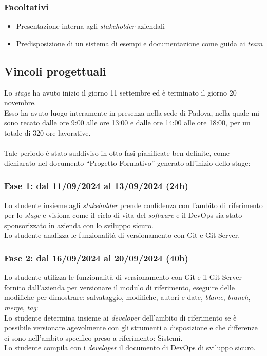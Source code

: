 \subsubsection*{Facoltativi}
\begin{itemize}
    \item Presentazione interna agli \emph{stakeholder} aziendali
    \item Predisposizione di un sistema di esempi e documentazione come guida ai \emph{team}\\
\end{itemize}


\subsection{Vincoli progettuali}
Lo \emph{stage} ha avuto inizio il giorno 11 settembre ed è terminato il giorno 20 novembre.\\
Esso ha avuto luogo interamente in presenza nella sede di Padova, nella quale mi sono recato dalle ore 9:00 alle ore 13:00 e dalle ore 14:00 alle ore 18:00, per un totale di 320 ore lavorative.\\\\
Tale periodo è stato suddiviso in otto fasi pianificate ben definite, come dichiarato nel documento “Progetto Formativo” generato all'inizio dello stage:
\subsubsection*{Fase 1: dal 11/09/2024 al 13/09/2024 (24h)}
Lo studente insieme agli \emph{stakeholder} prende confidenza con l'ambito di riferimento per lo \emph{stage} e visiona come il ciclo di vita del \emph{software} e il \gls{DevOps} sia stato sponsorizzato in azienda con lo sviluppo sicuro.\\
Lo studente analizza le funzionalità di versionamento con Git e Git Server.\\

\subsubsection*{Fase 2: dal 16/09/2024 al 20/09/2024 (40h) }
Lo studente utilizza le funzionalità di versionamento con Git e il Git Server fornito dall'azienda per versionare il modulo di riferimento, eseguire delle modifiche per dimostrare: salvataggio, modifiche, autori e date, \emph{blame}, \emph{branch}, \emph{merge}, \emph{tag}:\\
Lo studente determina insieme ai \emph{developer} dell'ambito di riferimento se è possibile versionare agevolmente con gli strumenti a disposizione e che differenze ci sono nell'ambito specifico preso a riferimento: \gls{Sistemi}.\\
Lo studente compila con i \emph{developer} il documento di \gls{DevOps} di sviluppo sicuro.\\

